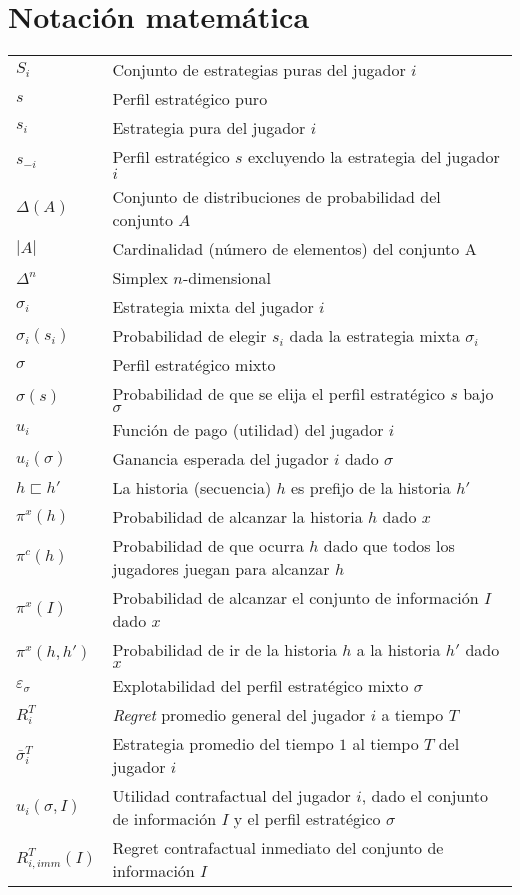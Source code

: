 \chapter*{Notación matemática}
\begingroup
\renewcommand{\arraystretch}{1.5}
\begin{tabular}{l p{12cm}}
$S_i$ & Conjunto de estrategias puras del jugador $i$ \\
$s$ & Perfil estratégico puro \\
$s_i$ & Estrategia pura del jugador $i$ \\
$s_{-i}$ & Perfil estratégico $s$ excluyendo la estrategia del jugador $i$ \\
$\Delta(A)$ & Conjunto de distribuciones de probabilidad del conjunto $A$ \\
$|A|$ & Cardinalidad (número de elementos) del conjunto A \\
$\Delta^n$ & Simplex $n$-dimensional \\
$\sigma_i$ & Estrategia mixta del jugador $i$ \\
$\sigma_i(s_i)$ & Probabilidad de elegir $s_i$ dada la estrategia mixta $\sigma_i$ \\
$\sigma$ & Perfil estratégico mixto \\
$\sigma(s)$ & Probabilidad de que se elija el perfil estratégico $s$ bajo $\sigma$ \\
$u_i$ & Función de pago (utilidad) del jugador $i$ \\
$u_i(\sigma)$ & Ganancia esperada del jugador $i$ dado $\sigma$ \\
$h \sqsubset h'$ & La historia (secuencia) $h$ es prefijo de la historia $h'$ \\ 
$\pi^{x}(h)$ & Probabilidad de alcanzar la historia $h$ dado $x$ \\
$\pi^c(h)$ & Probabilidad de que ocurra $h$ dado que todos los jugadores juegan para alcanzar $h$ \\
$\pi^x(I)$ & Probabilidad de alcanzar el conjunto de información $I$ dado $x$ \\
$\pi^x(h, h')$ & Probabilidad de ir de la historia $h$ a la historia $h'$ dado $x$ \\
$\varepsilon_{\sigma}$ & Explotabilidad del perfil estratégico mixto $\sigma$ \\
$R_i^T$ & \textit{Regret} promedio general del jugador $i$ a tiempo $T$ \\
$\bar\sigma^T_i$ & Estrategia promedio del tiempo $1$ al tiempo $T$ del jugador $i$ \\
$u_i(\sigma, I)$ & Utilidad contrafactual del jugador $i$, dado el conjunto de información $I$ y el perfil estratégico $\sigma$ \\
$R^T_{i, imm}(I)$ & Regret contrafactual inmediato del conjunto de información $I$
\end{tabular}
\endgroup